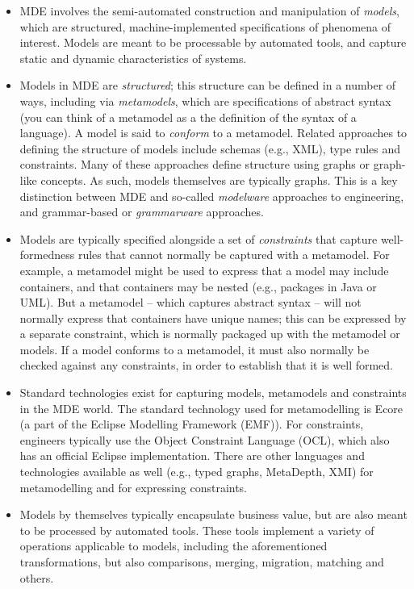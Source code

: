 \begin{itemize}
\item MDE involves the semi-automated construction and manipulation of \textit{models}, which are structured, machine-implemented specifications of phenomena of interest. Models are meant to be processable by automated tools, and capture static and dynamic characteristics of systems. 

\item Models in MDE are \textit{structured}; this structure can be defined in a number of ways, including via \textit{metamodels}, which are specifications of abstract syntax (you can think of a metamodel as a the definition of the syntax of a language). A model is said to \textit{conform} to a metamodel. Related approaches to defining the structure of models include schemas (e.g., XML), type rules and constraints. Many of these approaches define structure using graphs or graph-like concepts. As such, models themselves are typically graphs. This is a key distinction between MDE and so-called \textit{modelware} approaches to engineering, and grammar-based or \textit{grammarware} approaches.

\item Models are typically specified alongside a set of \textit{constraints} that capture well-formedness rules that cannot normally be captured with a metamodel. For example, a metamodel might be used to express that a model may include containers, and that containers may be nested (e.g., packages in Java or UML). But a metamodel -- which captures abstract syntax -- will not normally express that containers have unique names; this can be expressed by a separate constraint, which is normally packaged up with the metamodel or models. If a model conforms to a metamodel, it must also normally be checked against any constraints, in order to establish that it is well formed.

\item Standard technologies exist for capturing models, metamodels and constraints in the MDE world. The standard technology used for metamodelling is Ecore (a part of the Eclipse Modelling Framework (EMF)). For constraints, engineers typically use the Object Constraint Language (OCL), which also has an official Eclipse implementation. There are other languages and technologies available as well (e.g., typed graphs, MetaDepth, XMI) for metamodelling and for expressing constraints.

\item Models by themselves typically encapsulate business value, but are also meant to be processed by automated tools. These tools implement a variety of operations applicable to models, including the aforementioned transformations, but also comparisons, merging, migration, matching and others.
\end{itemize}


